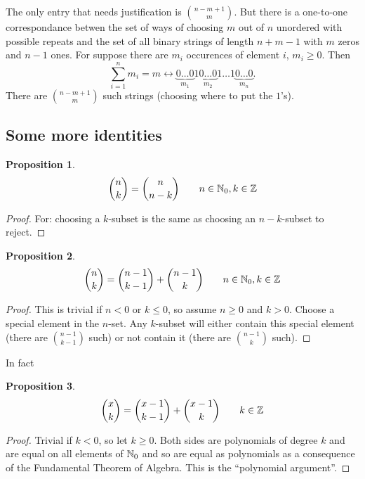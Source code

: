 \documentclass{notes}
\theoremstyle{plain}
\newtheorem*{proposition}{Proposition}
\begin{document}
The only entry that needs justification is $\binom{n-m+1}{m}$.  But there
is a one-to-one correspondance betwen the set of ways of choosing $m$ out
of $n$ unordered with possible repeats and the set of all binary strings
of length $n + m - 1$ with $m$ zeros and $n-1$ ones.  For suppose there
are $m_i$ occurences of element $i$, $m_i \ge 0$.  Then
\[
\sum_{i=1}^n m_i = m \leftrightarrow
\underbrace{0 \dots 0}_{m_1} 1 \underbrace{0 \dots 0}_{m_2} 1 \dots 1
\underbrace{0 \dots 0}_{m_n}.
\] 
There are $\binom{n-m+1}{m}$ such strings (choosing where to put the $1$'s).

\subsection{Some more identities}

\begin{proposition}
\[
\binom{n}{k} = \binom{n}{n-k} \qquad n \in \mathbb{N}_0, k \in \mathbb{Z}
\]
\end{proposition}

\begin{proof}
For: choosing a $k$-subset is the same as choosing an $n-k$-subset to
reject.
\end{proof}

\begin{proposition}
\[
\binom{n}{k} = \binom{n-1}{k-1} + \binom{n-1}{k} \qquad n \in \mathbb{N}_0, k \in \mathbb{Z}
\]
\end{proposition}

\begin{proof}
This is trivial if $n < 0$ or $k \le 0$, so assume $n \ge 0$ and $k > 0$.
Choose a special element in the $n$-set.  Any $k$-subset will either contain
this special element (there are $\binom{n-1}{k-1}$ such) or not contain it
(there are $\binom{n-1}{k}$ such).
\end{proof}

In fact

\begin{proposition}
\[
\binom{x}{k} = \binom{x-1}{k-1} + \binom{x-1}{k} \qquad k \in \mathbb{Z}
\]
\end{proposition}

\begin{proof}
Trivial if $k < 0$, so let $k \ge 0$.  Both sides are polynomials of degree
$k$ and are equal on all elements of $\mathbb{N}_0$ and so are equal as polynomials
as a consequence of the Fundamental Theorem of Algebra.  This is
the ``polynomial argument''.
\end{proof}
\end{document}
